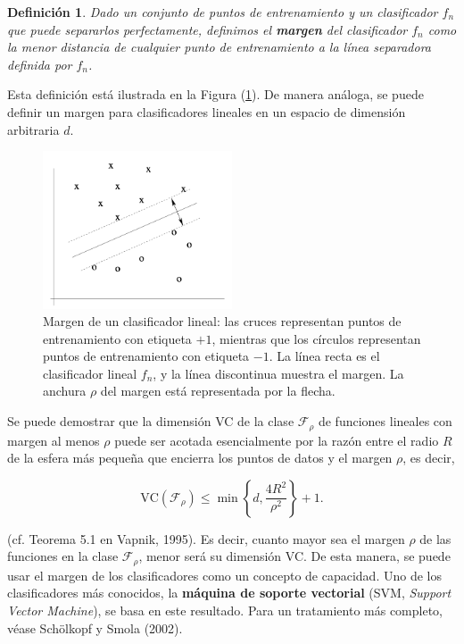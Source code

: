 \documentclass{article}
\newtheorem{dfn}{Definición}[subsection]
\begin{document}
\begin{dfn}
    Dado un conjunto de puntos de entrenamiento y un clasificador \(f_n\) que puede separarlos perfectamente, definimos 
    el \textbf{margen} del clasificador \(f_n\) como la menor distancia de cualquier punto de entrenamiento 
    a la línea separadora definida por \(f_n\).  \label{def:margen} 
\end{dfn}

Esta definición está ilustrada en la Figura (\ref{fig:Clasificación con margen}). 
De manera análoga, se puede definir un margen para clasificadores lineales en un espacio de dimensión arbitraria \(d\).

\begin{figure}[ht!]
    \centering
    \includegraphics[width=0.5\textwidth]{Images/6.png}
    \caption{Margen de un clasificador lineal: las cruces representan puntos de entrenamiento con 
    etiqueta \(+1\), mientras que los círculos representan puntos de entrenamiento con etiqueta \(-1\). 
    La línea recta es el clasificador lineal \(f_n\), y la línea discontinua muestra el margen. La 
    anchura \(\rho\) del margen está representada por la flecha.}
    \label{fig:Clasificación con margen}
\end{figure}

Se puede demostrar que la dimensión VC de la clase \(\mathcal{F}_\rho\) de funciones lineales con 
margen al menos \(\rho\) puede ser acotada esencialmente por la razón entre el radio \(R\) de la 
esfera más pequeña que encierra los puntos de datos y el margen \(\rho\), es decir,

\[
\text{VC}(\mathcal{F}_\rho) \leq \min \left\{d, \frac{4R^2}{\rho^2} \right\} +1.
\]

(cf. Teorema 5.1 en Vapnik, 1995). Es decir, cuanto mayor sea el margen \(\rho\) de las funciones 
en la clase \(\mathcal{F}_\rho\), menor será su dimensión VC. De esta manera, se puede usar el 
margen de los clasificadores como un concepto de capacidad. Uno de los clasificadores más conocidos, 
la \textbf{máquina de soporte vectorial} (SVM, \textit{Support Vector Machine}), se basa en este 
resultado. Para un tratamiento más completo, véase Schölkopf y Smola (2002).\newline
\end{document}
